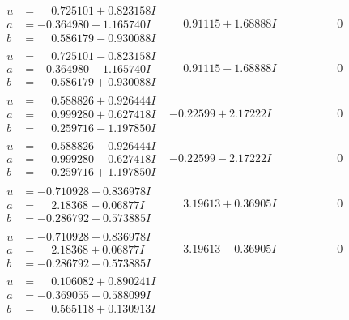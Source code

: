 \documentclass[1p]{elsarticle_modified}
\theoremstyle{definition}
\begin{document}
$$\begin{array}{c|c|c}
\begin{aligned}
u &= \phantom{-}0.725101 + 0.823158 I \\
a &= -0.364980 + 1.165740 I \\
b &= \phantom{-}0.586179 - 0.930088 I\end{aligned}
 & \phantom{-}0.91115 + 1.68888 I & \phantom{-0.000000 } 0 \\ \hline\begin{aligned}
u &= \phantom{-}0.725101 - 0.823158 I \\
a &= -0.364980 - 1.165740 I \\
b &= \phantom{-}0.586179 + 0.930088 I\end{aligned}
 & \phantom{-}0.91115 - 1.68888 I & \phantom{-0.000000 } 0 \\ \hline\begin{aligned}
u &= \phantom{-}0.588826 + 0.926444 I \\
a &= \phantom{-}0.999280 + 0.627418 I \\
b &= \phantom{-}0.259716 - 1.197850 I\end{aligned}
 & -0.22599 + 2.17222 I & \phantom{-0.000000 } 0 \\ \hline\begin{aligned}
u &= \phantom{-}0.588826 - 0.926444 I \\
a &= \phantom{-}0.999280 - 0.627418 I \\
b &= \phantom{-}0.259716 + 1.197850 I\end{aligned}
 & -0.22599 - 2.17222 I & \phantom{-0.000000 } 0 \\ \hline\begin{aligned}
u &= -0.710928 + 0.836978 I \\
a &= \phantom{-}2.18368 - 0.06877 I \\
b &= -0.286792 + 0.573885 I\end{aligned}
 & \phantom{-}3.19613 + 0.36905 I & \phantom{-0.000000 } 0 \\ \hline\begin{aligned}
u &= -0.710928 - 0.836978 I \\
a &= \phantom{-}2.18368 + 0.06877 I \\
b &= -0.286792 - 0.573885 I\end{aligned}
 & \phantom{-}3.19613 - 0.36905 I & \phantom{-0.000000 } 0 \\ \hline\begin{aligned}
u &= \phantom{-}0.106082 + 0.890241 I \\
a &= -0.369055 + 0.588099 I \\
b &= \phantom{-}0.565118 + 0.130913 I\end{aligned}

\end{array}$$
\end{document}
